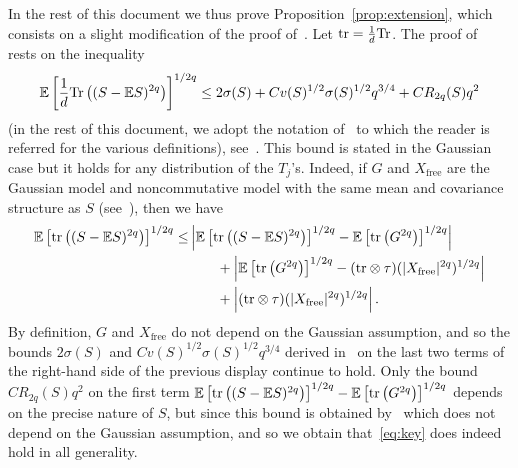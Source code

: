\documentclass[]{article}
\newcommand{\E}{\mathbb{E}}
\newcommand{\tr}{\text{\textnormal{tr}}}
\newcommand{\Tr}{\text{\rm Tr}}
\theoremstyle{plain}
\theoremstyle{definition}
\begin{document}
In the rest of this document we thus prove Proposition~\ref{prop:extension}, which consists on a slight modification of the proof of~\cite[Theorem 3.21]{Brailovskaya24-0}. Let $\tr = \frac{1}{d} \Tr$. The proof of~\cite[Theorem 3.21]{Brailovskaya24-0} rests on the inequality
\begin{equation} \label{eq:key}
	\E\left[\frac{1}{d}\Tr\left((S - \E S)^{2q}\right) \right]^{1/2q} \leq 2\sigma(S) + C v(S)^{1/2} \sigma(S)^{1/2} q^{3/4} + C R_{2q}(S) q^2
\end{equation}
(in the rest of this document, we adopt the notation of~\cite{Brailovskaya24-0} to which the reader is referred for the various definitions), see~\cite[p.\ 74]{Brailovskaya24-0}. This bound is stated in the Gaussian case but it holds for any distribution of the $T_j$'s. Indeed, if $G$ and $X_\text{free}$ are the Gaussian model and noncommutative model with the same mean and covariance structure as $S$ (see~\cite[sections~$2.1.2$ and~$2.1.3$]{Brailovskaya24-0}), then we have
\begin{align*}
	\E\left[\tr\left((S - \E S)^{2q}\right) \right]^{1/2q} \leq & \left \lvert \E\left[\tr\left((S - \E S)^{2q}\right) \right]^{1/2q} - \E\left[\tr\left(G^{2q}\right) \right]^{1/2q} \right \rvert\\
	& \ \ \ \ \ \ + \left \lvert \E\left[\tr\left(G^{2q}\right) \right]^{1/2q} -  (\tr \otimes 
 \tau)(\lvert X_{\text{free}}\rvert^{2q})^{1/2q} \right \rvert\\
	& \ \ \ \ \ \ + \left \lvert (\tr \otimes 
 \tau)(\lvert X_{\text{free}}\rvert^{2q})^{1/2q} \right \rvert.
\end{align*}
By definition, $G$ and $X_\text{free}$ do not depend on the Gaussian assumption, and so the bounds $2 \sigma(S)$ and $C v(S)^{1/2} \sigma(S)^{1/2} q^{3/4}$ derived in~\cite[Lemma~$2.5$ and Theorem~$2.7$]{Bandeira2023} on the last two terms of the right-hand side of the previous display continue to hold. Only the bound $C R_{2q}(S) q^2$ on the first term $\E\left[\tr\left((S - \E S)^{2q}\right) \right]^{1/2q} - \E\left[\tr\left(G^{2q}\right) \right]^{1/2q}$ depends on the precise nature of $S$, but since this bound is obtained by~\cite[Theorem~$2.9$]{Brailovskaya24-0} which does not depend on the Gaussian assumption, and so we obtain that~\eqref{eq:key} does indeed hold in all generality.
\end{document}
